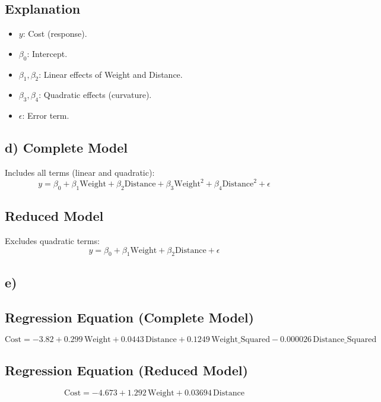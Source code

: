 \documentclass{article}
\begin{document}
\subsection*{Explanation}
\begin{itemize}
    \item \( y \): Cost (response).
    \item \( \beta_0 \): Intercept.
    \item \( \beta_1, \beta_2 \): Linear effects of Weight and Distance.
    \item \( \beta_3, \beta_4 \): Quadratic effects (curvature).
    \item \( \epsilon \): Error term.
\end{itemize}

\subsection*{d) Complete Model}

Includes all terms (linear and quadratic): 
\[
y = \beta_0 + \beta_1 \text{Weight} + \beta_2 \text{Distance} + \beta_3 \text{Weight}^2 + \beta_4 \text{Distance}^2 + \epsilon
\]

\subsection*{Reduced Model}
Excludes quadratic terms: 
\[
y = \beta_0 + \beta_1 \text{Weight} + \beta_2 \text{Distance} + \epsilon
\]


\subsection*{e) }
\subsection*{Regression Equation (Complete Model)}
\[
\text{Cost} = -3.82 + 0.299 \, \text{Weight} + 0.0443 \, \text{Distance} + 0.1249 \, \text{Weight\_Squared} - 0.000026 \, \text{Distance\_Squared}
\]

\subsection*{Regression Equation (Reduced Model)}
\[
\text{Cost} = -4.673 + 1.292 \, \text{Weight} + 0.03694 \, \text{Distance}
\]
\end{document}
